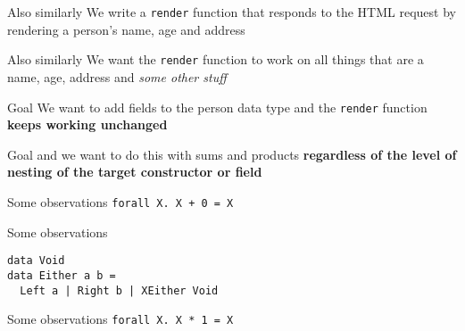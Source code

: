 \begin{frame}[fragile]
\begin{block}{Also similarly}
We write a \lstinline{render} function that responds to the HTML request by rendering a person's name, age and address
\end{block}
\end{frame}

\begin{frame}[fragile]
\begin{block}{Also similarly}
We want the \lstinline{render} function to work on all things that are a name, age, address and \emph{some other stuff}
\end{block}
\end{frame}

\begin{frame}[fragile]
\begin{block}{Goal}
We want to add fields to the person data type and the \lstinline{render} function \textbf{keeps working unchanged}
\end{block}
\end{frame}

\begin{frame}[fragile]
\begin{block}{Goal}
and we want to do this with sums and products \textbf{regardless of the level of nesting of the target constructor or field}
\end{block}
\end{frame}

\begin{frame}[fragile]
\begin{block}{Some observations}
\lstinline{forall X. X + 0 = X}
\end{block}
\end{frame}

\begin{frame}[fragile]
\begin{block}{Some observations}
\begin{lstlisting}[style=haskell]
data Void
data Either a b =
  Left a | Right b | XEither Void
\end{lstlisting}
\end{block}
\end{frame}

\begin{frame}[fragile]
\begin{block}{Some observations}
\lstinline{forall X. X * 1 = X}
\end{block}
\end{frame}

